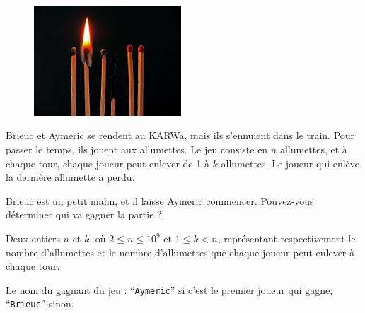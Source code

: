 \problemname{\problemyamlname}


\begin{figure}
	\centering
	\includegraphics[width=5.5cm]{allumettes.jpg}
\end{figure}
Brieuc et Aymeric se rendent au KARWa, mais ils s'ennuient dans le train. Pour passer le temps, ils jouent aux allumettes. Le jeu consiste en $n$ allumettes,
et à chaque tour, chaque joueur peut enlever de 1 à $k$ allumettes. Le joueur qui enlève la dernière allumette a perdu.

Brieuc est un petit malin, et il laisse Aymeric commencer. Pouvez-vous déterminer qui va gagner la partie ?

\begin{Input}
	Deux entiers $n$ et $k$, où $2 \le n \le 10^9$ et $1 \le k < n$, représentant respectivement le nombre d'allumettes et le nombre d'allumettes que chaque joueur peut enlever à chaque tour.
\end{Input}

\begin{Output}
	Le nom du gagnant du jeu : ``\verb|Aymeric|'' si c'est le premier joueur qui gagne, ``\verb|Brieuc|'' sinon.
\end{Output}
